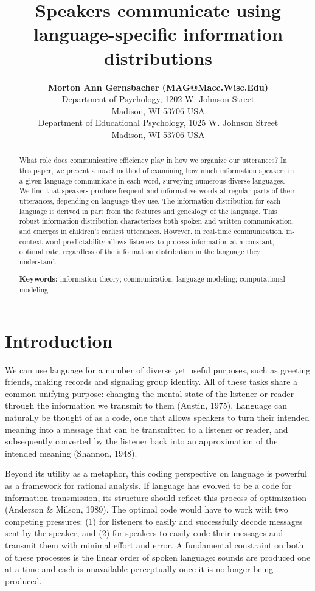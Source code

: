 \documentclass[10pt, letterpaper]{article}
\title{Speakers communicate using language-specific information distributions}
\author{{\large \bf Morton Ann Gernsbacher (MAG@Macc.Wisc.Edu)} \\ Department of Psychology, 1202 W. Johnson Street \\ Madison, WI 53706 USA \AND {\large \bf Sharon J.~Derry (SDJ@Macc.Wisc.Edu)} \\ Department of Educational Psychology, 1025 W. Johnson Street \\ Madison, WI 53706 USA}
\begin{document}
\maketitle

\begin{abstract}
What role does communicative efficiency play in how we organize our
utterances? In this paper, we present a novel method of examining how
much information speakers in a given language communicate in each word,
surveying numerous diverse languages. We find that speakers produce
frequent and informative words at regular parts of their utterances,
depending on language they use. The information distribution for each
language is derived in part from the features and genealogy of the
language. This robust information distribution characterizes both spoken
and written communication, and emerges in children's earliest
utterances. However, in real-time communication, in-context word
predictability allows listeners to process information at a constant,
optimal rate, regardless of the information distribution in the language
they understand.

\textbf{Keywords:}
information theory; communication; language modeling; computational
modeling
\end{abstract}

\hypertarget{introduction}{%
\section{Introduction}\label{introduction}}

We can use language for a number of diverse yet useful purposes, such as
greeting friends, making records and signaling group identity. All of
these tasks share a common unifying purpose: changing the mental state
of the listener or reader through the information we transmit to them
(Austin, 1975). Language can naturally be thought of as a code, one that
allows speakers to turn their intended meaning into a message that can
be transmitted to a listener or reader, and subsequently converted by
the listener back into an approximation of the intended meaning
(Shannon, 1948).

Beyond its utility as a metaphor, this coding perspective on language is
powerful as a framework for rational analysis. If language has evolved
to be a code for information transmission, its structure should reflect
this process of optimization (Anderson \& Milson, 1989). The optimal
code would have to work with two competing pressures: (1) for listeners
to easily and successfully decode messages sent by the speaker, and (2)
for speakers to easily code their messages and transmit them with
minimal effort and error. A fundamental constraint on both of these
processes is the linear order of spoken language: sounds are produced
one at a time and each is unavailable perceptually once it is no longer
being produced.
\end{document}
